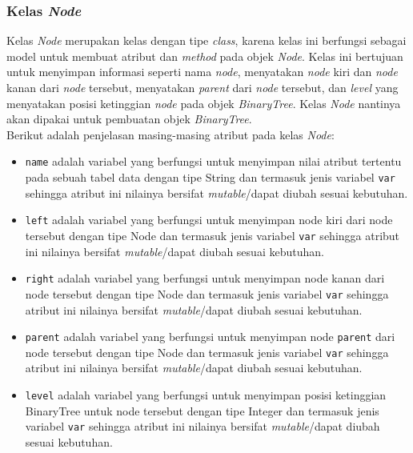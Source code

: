 \subsubsection{Kelas \textit{Node}}
Kelas \textit{Node} merupakan kelas dengan tipe \textit{class}, karena kelas ini berfungsi sebagai model untuk membuat atribut dan \textit{method} pada objek \textit{Node}. Kelas ini bertujuan untuk menyimpan informasi seperti nama \textit{node}, menyatakan \textit{node} kiri dan \textit{node} kanan dari \textit{node} tersebut, menyatakan \textit{parent} dari \textit{node} tersebut, dan \textit{level} yang menyatakan posisi ketinggian \textit{node} pada objek \textit{BinaryTree}. Kelas \textit{Node} nantinya akan dipakai untuk pembuatan objek \textit{BinaryTree}.\\

\noindent Berikut adalah penjelasan masing-masing atribut pada kelas \textit{Node}:

\begin{itemize}

\item \texttt{name} adalah variabel yang berfungsi untuk menyimpan nilai atribut tertentu pada sebuah tabel data dengan tipe String dan termasuk jenis variabel \texttt{var} sehingga atribut ini nilainya bersifat \textit{mutable}/dapat diubah sesuai kebutuhan.

\item \texttt{left} adalah variabel yang berfungsi untuk menyimpan node kiri dari  node tersebut dengan tipe Node dan termasuk jenis variabel \texttt{var} sehingga atribut ini nilainya bersifat \textit{mutable}/dapat diubah sesuai kebutuhan.

\item \texttt{right} adalah variabel yang berfungsi untuk menyimpan node kanan dari node tersebut dengan tipe Node dan termasuk jenis variabel \texttt{var} sehingga atribut ini nilainya bersifat \textit{mutable}/dapat diubah sesuai kebutuhan.

\item \texttt{parent} adalah variabel yang berfungsi untuk menyimpan node \texttt{parent} dari node tersebut dengan tipe Node dan termasuk jenis variabel \texttt{var} sehingga atribut ini nilainya bersifat \textit{mutable}/dapat diubah sesuai kebutuhan.


\item \texttt{level} adalah variabel yang berfungsi untuk menyimpan posisi ketinggian BinaryTree untuk node tersebut dengan tipe Integer dan termasuk jenis variabel \texttt{var} sehingga atribut ini nilainya bersifat \textit{mutable}/dapat diubah sesuai kebutuhan.

\end{itemize}

